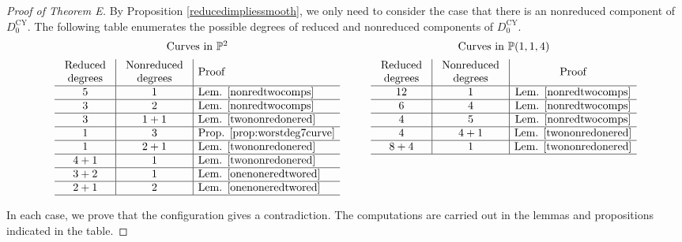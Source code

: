\documentclass[JEP,XML,SOM,Unicode,NoFloatCountersInSection,published]{cedram}
\theoremstyle{plain}
\theoremstyle{definition}
\newcommand\PP{{\mathbb{P}}}
\newcommand\Dcyo{{D^{\mathrm{CY}}_0}}
\begin{document}
\begin{proof}[Proof of Theorem E]
By Proposition \ref{reducedimpliessmooth}, we only need to consider the case that there is an nonreduced component of $\Dcyo$. The following table enumerates the possible degrees of reduced and nonreduced components of $\Dcyo$.\smaller
\[\arraycolsep4.5pt
\begin{array}{ccc}
\text{Curves in $\PP^2$}&\quad&\text{Curves in $\PP(1,1,4)$}\\[5pt]
\begin{array}[t]{c|c|l}
\begin{array}{c}\text{Reduced}\\\text{degrees}\end{array}&\begin{array}{c}\text{Nonreduced}\\\text{degrees}\end{array}&\text{Proof}\\\hline
5&1&\text{Lem. \ref{nonredtwocomps}}\\\hline
3&2&\text{Lem. \ref{nonredtwocomps}}\\\hline
3&1+1&\text{Lem. \ref{twononredonered}}\\\hline
1&3&\text{Prop. \ref{prop:worstdeg7curve}}\\\hline
1&2+1&\text{Lem. \ref{twononredonered}}\\\hline
4+1&1&\text{Lem. \ref{twononredonered}}\\\hline
3+2&1&\text{Lem. \ref{onenoneredtwored}}\\\hline
2+1&2&\text{Lem. \ref{onenoneredtwored}}\\\hline
\end{array}&&
\begin{array}[t]{c|c|c}\begin{array}{c}\text{Reduced}\\\text{degrees}\end{array}&\begin{array}{c}\text{Nonreduced}\\\text{degrees}\end{array}&\text{Proof}\\\hline
12&1&\text{Lem. \ref{nonredtwocomps}}\\\hline
6&4&\text{Lem. \ref{nonredtwocomps}}\\\hline
4&5&\text{Lem. \ref{nonredtwocomps}}\\\hline
4&4+1&\text{Lem. \ref{twononredonered}}\\\hline
8+4&1&\text{Lem. \ref{twononredonered}}\\\hline
\end{array}
\end{array}
\]\larger

\smallskip
In each case, we prove that the configuration gives a contradiction. The computations are carried out in the lemmas and propositions indicated in the table.
\end{proof}
\end{document}
